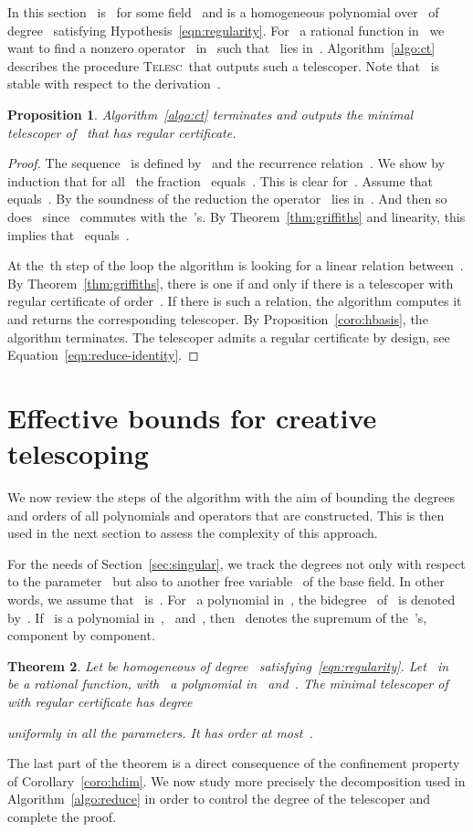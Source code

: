 \documentclass{sig-alternate}
\newtheorem{thm}{Theorem}
\newtheorem{prop}[thm]{Proposition}
\newcommand{\tCreatTel}{\textsc{Telesc}}
\begin{document}
\noindent In this section~ is~ for some field~ and  is a homogeneous polynomial over~ of degree~ satisfying Hypothesis~\eqref{eqn:regularity}. 
For~ a rational function in~ we want to find a nonzero operator~ in~ such that~ lies in~.
Algorithm~\ref{algo:ct} describes the procedure \tCreatTel\ that outputs such a telescoper.
Note that~ is stable with respect to the derivation~.

\begin{prop}
Algorithm~\ref{algo:ct} terminates and outputs the minimal telescoper of~ that has regular certificate.
\end{prop}

\begin{proof}
The sequence~ is defined by~ and the recurrence relation~.
We show by induction that for all~ the fraction~ equals~.
This is clear for~. Assume that~ equals~.
By the soundness of the reduction the operator~ lies in~. 
And then so does~ since~ commutes with the~'s.
By Theorem~\ref{thm:griffiths} and linearity, this implies that~ equals~.

At the~th step of the loop the algorithm is looking for a linear relation between~.
By Theorem~\ref{thm:griffiths}, there is one if and only if there is a telescoper with regular certificate of order~.
If there is such a relation, the algorithm computes it and returns the corresponding telescoper.
By Proposition~\ref{coro:hbasis}, the algorithm terminates.
The telescoper admits a regular certificate by design, see Equation~\eqref{eqn:reduce-identity}.
\end{proof}

\section{Effective bounds for creative telescoping}\label{sec:eff-bounds}

\noindent We now review the steps of the algorithm with the aim of bounding the degrees and orders of all polynomials and operators that are constructed.
This is then used in the next section to assess the complexity of this approach.

For the needs of Section~\ref{sec:singular}, we track the degrees not only with respect to the parameter~ but also to another free variable~ of the base field. 
In other words, we assume that~ is~.
For~ a polynomial in~, the bi\-degree~ of~ is denoted by~.
If~ is a polynomial in~,~ and~, then~ denotes the supremum of the~'s, component by component.


\begin{thm}\label{coro:asy-deg}
Let  be homogeneous of degree~ satisfying~\eqref{eqn:regularity}.
  Let~ in~ be a rational function, with~ a polynomial in~ and~.
  The minimal telescoper  of~  with regular certificate has  degree
  
  uniformly in all the parameters. It has order at most~.
\end{thm}
The last part of the theorem is a direct consequence of the confinement property of Corollary~\ref{coro:hdim}.
We now study more precisely the decomposition used in Algorithm~\ref{algo:reduce} in order to control the degree of the telescoper and complete the proof.
\end{document}
